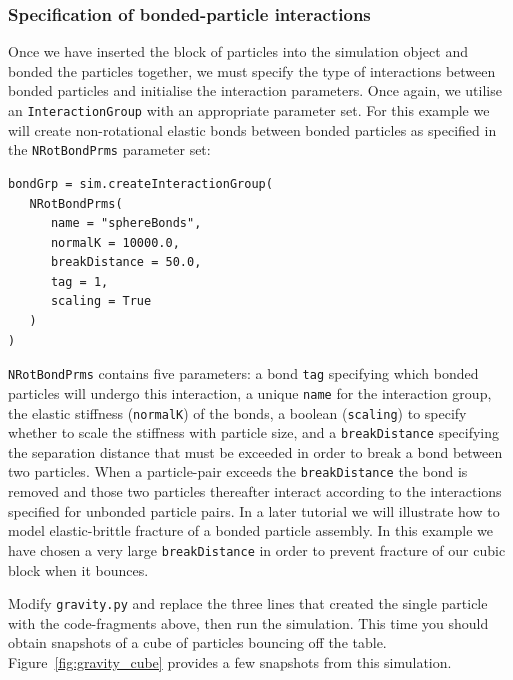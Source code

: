 \subsubsection{Specification of bonded-particle interactions}

Once we have inserted the block of particles into the simulation object and bonded the particles together, we must specify the type of interactions between bonded particles and initialise the interaction parameters. Once again, we utilise an \texttt{InteractionGroup} with an appropriate parameter set. For this example we will create non-rotational elastic bonds between bonded particles as specified in the \texttt{NRotBondPrms} parameter set:

\begin{verbatim}
bondGrp = sim.createInteractionGroup(
   NRotBondPrms(
      name = "sphereBonds",
      normalK = 10000.0,
      breakDistance = 50.0,
      tag = 1,
      scaling = True
   )
)
\end{verbatim}

\noindent 
\texttt{NRotBondPrms} contains five parameters: a bond \texttt{tag} specifying which bonded particles will undergo this interaction, a unique \texttt{name} for the interaction group, the elastic stiffness (\texttt{normalK}) of the bonds, a boolean (\texttt{scaling}) to specify whether to scale the stiffness with particle size, and a \texttt{breakDistance} specifying the separation distance that must be exceeded in order to break a bond between two particles. When a particle-pair exceeds the \texttt{breakDistance} the bond is removed and those two particles thereafter interact according to the interactions specified for unbonded particle pairs. In a later tutorial we will illustrate how to model elastic-brittle fracture of a bonded particle assembly. In this example we have chosen a very large \texttt{breakDistance} in order to prevent fracture of our cubic block when it bounces.

Modify \texttt{gravity.py} and replace the three lines that created the single particle with the code-fragments above, then run the simulation. This time you should obtain snapshots of a cube of particles bouncing off the table. Figure~\ref{fig:gravity_cube} provides a few snapshots from this simulation.

